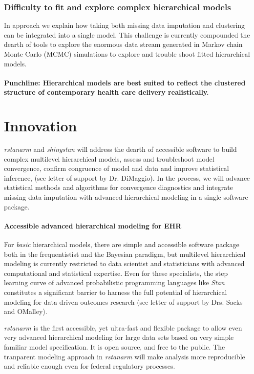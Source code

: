 \documentclass[11pt,notitlepage]{article}
\begin{document}
\section*{Difficulty to fit and explore complex hierarchical models}
In approach we explain  how taking both missing data imputation and clustering can be integrated into a single model. This challenge is currently compounded the dearth of tools to explore the enormous data stream generated in Markov chain Monte Carlo (MCMC) simulations to explore and trouble shoot fitted hierarchical models.  

\subsection*{Punchline: Hierarchical models  are best suited to reflect the clustered structure of contemporary health care delivery realistically.}

\part*{Innovation}

\textit{rstanarm} and \textit{shinystan} will address the dearth of accessible software to build complex multilevel hierarchical models, assess and troubleshoot model convergence, confirm congruence of model and data and improve statistical inference, (see letter of support by Dr. DiMaggio). In the process, we will advance statistical methods and algorithms for convergence diagnostics and integrate missing data imputation with advanced hierarchical modeling in a single software package.  

\subsection*{Accessible advanced hierarchical modeling for EHR}

For \textit{basic} hierarchical models, there are simple and accessible software package both in the frequentistist and the Bayesian paradigm, but multilevel hierarchical modeling is currently restricted to data scientist and statisticians with advanced computational and statistical expertise. Even for these specialists, the step learning curve of advanced probabilistic programming languages like \textit{Stan} constitutes a significant barrier to harness the full potential of hierarchical modeling for data driven outcomes research (see letter of support by Drs. Sacks and OMalley).

\textit{rstanarm} is the first accessible, yet ultra-fast and flexible package to allow even very advanced hierarchical modeling for large data sets based on very simple familiar model specification. It is open source, and free to the public. The tranparent modeling approach in \textit{rstanarm} will make analysis more reproducible and reliable enough even for federal regulatory processes. 
\end{document}
